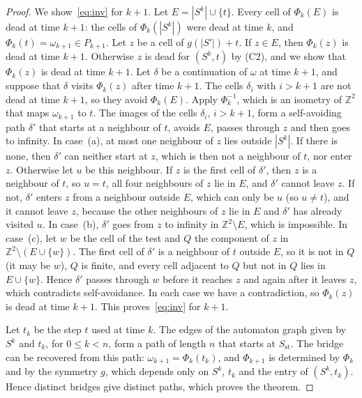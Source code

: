 \documentclass[11pt]{amsart}
\theoremstyle{definition}
\theoremstyle{remark}
\numberwithin{equation}{section}
\newcommand{\Z}{\mathbb{Z}}
\begin{document}
\begin{proof}
We show~\eqref{eq:inv} for $k+1$. Let $E=|S^k|\cup\{t\}$. Every cell of $\Phi_k(E)$ is dead at time $k+1$: the cells of $\Phi_k(|S^k|)$ were dead at time $k$, and $\Phi_k(t)=\omega_{k+1}\in P_{k+1}$. Let $z$ be a cell of $g(|S'|)+t$. If $z\in E$, then $\Phi_k(z)$ is dead at time $k+1$. Otherwise $z$ is dead for $(S^k,t)$ by (C2), and we show that $\Phi_k(z)$ is dead at time $k+1$. Let $\delta$ be a continuation of $\omega$ at time $k+1$, and suppose that $\delta$ visits $\Phi_k(z)$ after time $k+1$. The cells $\delta_i$ with $i>k+1$ are not dead at time $k+1$, so they avoid $\Phi_k(E)$. Apply $\Phi_k^{-1}$, which is an isometry of $\Z^2$ that maps $\omega_{k+1}$ to $t$. The images of the cells $\delta_i$, $i>k+1$, form a self-avoiding path $\delta'$ that starts at a neighbour of $t$, avoids $E$, passes through $z$ and then goes to infinity. In case~(a), at most one neighbour of $z$ lies outside $|S^k|$. If there is none, then $\delta'$ can neither start at $z$, which is then not a neighbour of $t$, nor enter $z$. Otherwise let $u$ be this neighbour. If $z$ is the first cell of $\delta'$, then $z$ is a neighbour of $t$, so $u=t$, all four neighbours of $z$ lie in $E$, and $\delta'$ cannot leave $z$. If not, $\delta'$ enters $z$ from a neighbour outside $E$, which can only be $u$ (so $u\ne t$), and it cannot leave $z$, because the other neighbours of $z$ lie in $E$ and $\delta'$ has already visited $u$. In case~(b), $\delta'$ goes from $z$ to infinity in $\Z^2\setminus E$, which is impossible. In case~(c), let $w$ be the cell of the test and $Q$ the component of $z$ in $\Z^2\setminus(E\cup\{w\})$. The first cell of $\delta'$ is a neighbour of $t$ outside $E$, so it is not in $Q$ (it may be $w$), $Q$ is finite, and every cell adjacent to $Q$ but not in $Q$ lies in $E\cup\{w\}$. Hence $\delta'$ passes through $w$ before it reaches $z$ and again after it leaves $z$, which contradicts self-avoidance. In each case we have a contradiction, so $\Phi_k(z)$ is dead at time $k+1$. This proves~\eqref{eq:inv} for $k+1$.

Let $t_k$ be the step $t$ used at time $k$. The edges of the automaton graph given by $S^k$ and $t_k$, for $0\le k<n$, form a path of length $n$ that starts at $S_\mathrm{st}$. The bridge can be recovered from this path: $\omega_{k+1}=\Phi_k(t_k)$, and $\Phi_{k+1}$ is determined by $\Phi_k$ and by the symmetry $g$, which depends only on $S^k$, $t_k$ and the entry of $(S^k,t_k)$. Hence distinct bridges give distinct paths, which proves the theorem.
\end{proof}
\end{document}
